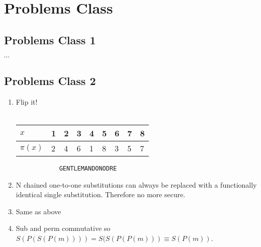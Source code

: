 \chapter{Problems Class}

	\section{Problems Class 1}
		$\cdots$

	\section{Problems Class 2}
	\begin{enumerate}
		\item Flip it!\\\\
			\begin{tabular}{lllllllll}
				\toprule
				$x$&1&2&3&4&5&6&7&8\\
				\midrule
				$\pi(x)$&2&4&6&1&8&3&5&7\\
				\bottomrule
			\end{tabular}

			\begin{verbatim}
			GENTLEMANDONODRE
			\end{verbatim}

		\item N chained one-to-one substitutions can always be replaced with a functionally identical single substitution. Therefore no more secure.

		\item Same as above

		\item Sub and perm commutative so $S(P(S(P(m)))) = S(S(P(P(m))) \equiv S(P(m))$.
	\end{enumerate}

